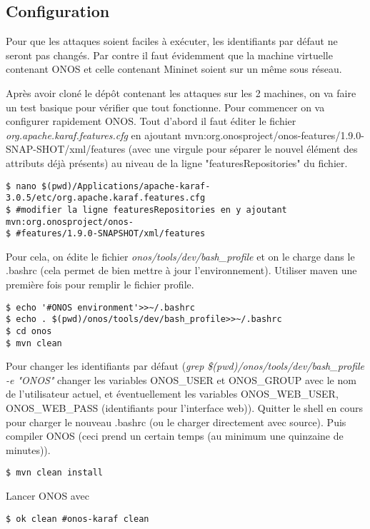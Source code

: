 \subsection{Configuration}

Pour que les attaques soient faciles à exécuter, les identifiants par défaut ne seront pas changés. Par contre il faut évidemment que la machine virtuelle contenant ONOS et celle contenant Mininet soient sur un même sous réseau.

Après avoir cloné le dépôt contenant les attaques sur les 2 machines, on va faire un test basique pour vérifier que tout fonctionne. Pour commencer on va configurer rapidement ONOS. Tout d'abord il faut éditer le fichier \textit{org.apache.karaf.features.cfg} en ajoutant mvn:org.onosproject/onos-features/1.9.0-SNAP-SHOT/xml/features (avec une virgule pour séparer le nouvel élément des attributs déjà présents) au niveau de la ligne "featuresRepositories" du fichier.

\begin{verbatim}
$ nano $(pwd)/Applications/apache-karaf-3.0.5/etc/org.apache.karaf.features.cfg
$ #modifier la ligne featuresRepositories en y ajoutant mvn:org.onosproject/onos-
$ #features/1.9.0-SNAPSHOT/xml/features
\end{verbatim}

Pour cela, on édite le fichier \textit{onos/tools/dev/bash\_profile} et on le charge dans le .bashrc (cela permet de bien mettre à jour l'environnement). Utiliser maven une première fois pour remplir le fichier profile.

\begin{verbatim}
$ echo '#ONOS environment'>>~/.bashrc
$ echo . $(pwd)/onos/tools/dev/bash_profile>>~/.bashrc
$ cd onos
$ mvn clean
\end{verbatim}

Pour changer les identifiants par défaut (\textit{grep \$(pwd)/onos/tools/dev/bash\_profile -e "ONOS"} changer les variables ONOS\_USER et ONOS\_GROUP avec le nom de l'utilisateur actuel, et éventuellement les variables ONOS\_WEB\_USER, ONOS\_WEB\_PASS (identifiants pour l'interface web)).
Quitter le shell en cours pour charger le nouveau .bashrc (ou le charger directement avec source).
Puis compiler ONOS (ceci prend un certain temps (au minimum une quinzaine de minutes)).

\begin{verbatim}
$ mvn clean install
\end{verbatim}

Lancer ONOS avec
\begin{verbatim}
$ ok clean #onos-karaf clean
\end{verbatim}